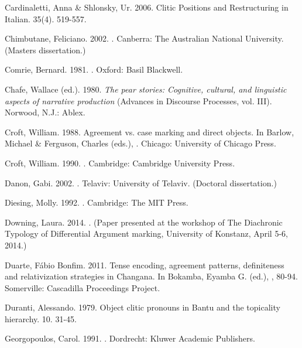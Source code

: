 \documentclass[output=paper]{langsci/langscibook}
\begin{document}
Cardinaletti, Anna \& Shlonsky, Ur. 2006. Clitic Positions and Restructuring in Italian.  35(4). 519-557.

Chimbutane, Feliciano. 2002. . Canberra: The Australian National University. (Masters dissertation.)

Comrie, Bernard. 1981. . Oxford: Basil Blackwell.

Chafe, Wallace (ed.). 1980. \textit{The pear stories: Cognitive, cultural, and linguistic aspects of narrative production} (Advances in Discourse Processes, vol. III). Norwood, N.J.: Ablex.

Croft, William. 1988. Agreement vs. case marking and direct objects. In Barlow, Michael \& Ferguson, Charles (eds.), . Chicago: University of Chicago Press.

Croft, William. 1990. . Cambridge: Cambridge University Press.

Danon, Gabi. 2002. . Telaviv: University of Telaviv. (Doctoral dissertation.)

Diesing, Molly. 1992. . Cambridge: The MIT Press.

Downing, Laura. 2014. . (Paper presented at the workshop of The Diachronic Typology of Differential Argument marking, University of Konstanz, April 5-6, 2014.)

Duarte, Fábio Bonfim. 2011. Tense encoding, agreement patterns, definiteness and relativization strategies in Changana. In Bokamba, Eyamba G. (ed.), , 80-94. Somerville: Cascadilla Proceedings Project.

Duranti, Alessando. 1979. Object clitic pronouns in Bantu and the topicality hierarchy.  10. 31-45.

Georgopoulos, Carol. 1991. . Dordrecht: Kluwer Academic Publishers.
\end{document}
